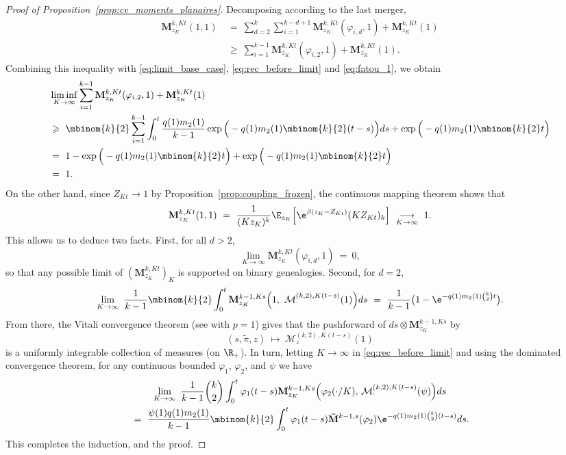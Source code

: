 \begin{refsegment}
\begin{proof}[Proof of Proposition~\ref{prop:cv_moments_planaires}]
Decomposing according to the last
merger, 
\begin{align*}
    \mathbf{M}^{k,Kt}_{z_K}(1,1)\ 
    &=\ \sum_{d=2}^k\sum_{i=1}^{k-d+1} 
    \mathbf{M}^{k,Kt}_{z_K}(\varphi_{i,d},1)
    + \mathbf{M}^{k,Kt}_{z_K}(1) \\
    &\geqslant\ 
    \sum_{i=1}^{k-1} 
    \mathbf{M}^{k,Kt}_{z_K}(\varphi_{i,2},1)
    + \mathbf{M}^{k,Kt}_{z_K}(1).
\end{align*}
Combining this inequality with \eqref{eq:limit_base_case}, \eqref{eq:rec_before_limit}  and 
\eqref{eq:fatou_1}, we obtain
\begin{align*}
   &\liminf_{K \to \infty}
    \sum_{i=1}^{k-1} 
    \mathbf{M}^{k,Kt}_{z_K}(\varphi_{i,2},1)
    + \mathbf{M}^{k,Kt}_{z_K}(1)\\
    &\geqslant\  
        \mbinom{k}{2} 
        \sum_{i=1}^{k-1} \int_0^t 
       \frac{q(1)m_2(1)}{k-1} \exp\Big(-q(1)m_2(1)\mbinom{k}{2}(t-s)\Big) ds 
        + \exp\Big(-q(1)m_2(1)\mbinom{k}{2}t\Big) 
   \\
    & =\  1-\exp\Big(-q(1)m_2(1)\mbinom{k}{2}t\Big) 
        + \exp\Big(-q(1)m_2(1)\mbinom{k}{2}t\Big)  \\
    & =\ 1.
\end{align*}
On the other hand, since $Z_{Kt} \to 1$ by
Proposition~\ref{prop:coupling_frozen}, the continuous mapping
theorem shows that 
\[
   \mathbf{M}^{k,Kt}_{z_K}(1,1)
  \ =\ 
  \frac{1}{(K z_K)^k} \E_{z_K}\Big[\e^{\beta(z_K-Z_{Kt})} (K Z_{Kt})_k \Big]
  \ \underset{K\to\infty}{\longrightarrow}\ 1.
\]
This allows us to deduce two facts. First, for all $d > 2$,
\[
    \lim_{K \to \infty} \mathbf{M}^{k,Kt}_{z_K}(\varphi_{i,d},1)\ =\ 0,
\]
so that any possible limit of $(\mathbf{M}^{k,Kt}_{z_K})_K$ is supported
on binary genealogies. Second, for $d=2$,
\[
    \lim_{K \to \infty}\ \frac{1}{k-1} \mbinom{k}{2} \int_0^t 
    \mathbf{M}^{k-1,Ks}_{z_K}\Big(1,\ \mathcal{M}^{(k,2),K(t-s)}_{\cdot}(1)\Big) ds
    \ =\ \frac{1}{k-1}\big( 1 - \e^{-q(1)m_2(1) \binom{k}{2} t} \big).
\]
From there, the Vitali convergence theorem (see 
\cite[Lemma~22.7]{schilling_measures_2017} with $p=1$) gives that the pushforward
of $ds \otimes \mathbf{M}^{k-1,Ks}_{z_K}$ by
\[
    (s, \tilde\pi, z)\ \longmapsto\ \mathcal{M}^{(k,2), K(t-s)}_z(1)
\]
is a uniformly integrable collection of measures (on $\R_+$). In turn,
letting $K \to \infty$ in \eqref{eq:rec_before_limit} and using the
dominated convergence theorem, for any continuous bounded $\varphi_1$,
$\varphi_2$, and $\psi$ we have
\begin{multline*}
    \lim_{K \to \infty}\ \frac{1}{k-1} \binom{k}{2} \int_0^t \varphi_1(t-s)
    \mathbf{M}^{k-1,Ks}_{z_K}\Big(\varphi_2(\cdot/K),\, 
    \mathcal{M}^{(k,2),K(t-s)}_{\cdot}(\psi)\Big) ds \\
   \ =\ \frac{\psi(1) q(1) m_2(1)}{k-1} \mbinom{k}{2}
    \int_0^t \varphi_1(t-s) \mathbf{\bar{M}}^{k-1,s}(\varphi_2)
    \e^{-q(1)m_2(1)\binom{k}{2}(t-s)} ds.
\end{multline*}
This completes the induction, and the proof.
\end{proof}


\end{refsegment}
